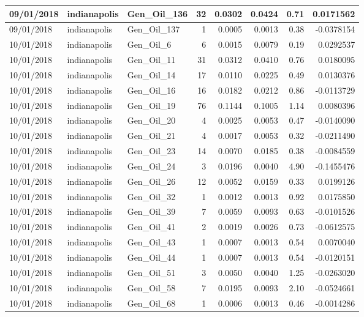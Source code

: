 \documentclass[
  letterpaper,
  DIV=11,
  numbers=noendperiod]{scrartcl}
\begin{document}
\begin{tabular}{l|l|l|r|r|r|r|r}
\hline
09/01/2018 & indianapolis & Gen\_Oil\_136 & 32 & 0.0302 & 0.0424 & 0.71 & 0.0171562\\
\hline
09/01/2018 & indianapolis & Gen\_Oil\_137 & 1 & 0.0005 & 0.0013 & 0.38 & -0.0378154\\
\hline
10/01/2018 & indianapolis & Gen\_Oil\_6 & 6 & 0.0015 & 0.0079 & 0.19 & 0.0292537\\
\hline
10/01/2018 & indianapolis & Gen\_Oil\_11 & 31 & 0.0312 & 0.0410 & 0.76 & 0.0180095\\
\hline
10/01/2018 & indianapolis & Gen\_Oil\_14 & 17 & 0.0110 & 0.0225 & 0.49 & 0.0130376\\
\hline
10/01/2018 & indianapolis & Gen\_Oil\_16 & 16 & 0.0182 & 0.0212 & 0.86 & -0.0113729\\
\hline
10/01/2018 & indianapolis & Gen\_Oil\_19 & 76 & 0.1144 & 0.1005 & 1.14 & 0.0080396\\
\hline
10/01/2018 & indianapolis & Gen\_Oil\_20 & 4 & 0.0025 & 0.0053 & 0.47 & -0.0140090\\
\hline
10/01/2018 & indianapolis & Gen\_Oil\_21 & 4 & 0.0017 & 0.0053 & 0.32 & -0.0211490\\
\hline
10/01/2018 & indianapolis & Gen\_Oil\_23 & 14 & 0.0070 & 0.0185 & 0.38 & -0.0084559\\
\hline
10/01/2018 & indianapolis & Gen\_Oil\_24 & 3 & 0.0196 & 0.0040 & 4.90 & -0.1455476\\
\hline
10/01/2018 & indianapolis & Gen\_Oil\_26 & 12 & 0.0052 & 0.0159 & 0.33 & 0.0199126\\
\hline
10/01/2018 & indianapolis & Gen\_Oil\_32 & 1 & 0.0012 & 0.0013 & 0.92 & 0.0175850\\
\hline
10/01/2018 & indianapolis & Gen\_Oil\_39 & 7 & 0.0059 & 0.0093 & 0.63 & -0.0101526\\
\hline
10/01/2018 & indianapolis & Gen\_Oil\_41 & 2 & 0.0019 & 0.0026 & 0.73 & -0.0612575\\
\hline
10/01/2018 & indianapolis & Gen\_Oil\_43 & 1 & 0.0007 & 0.0013 & 0.54 & 0.0070040\\
\hline
10/01/2018 & indianapolis & Gen\_Oil\_44 & 1 & 0.0007 & 0.0013 & 0.54 & -0.0120151\\
\hline
10/01/2018 & indianapolis & Gen\_Oil\_51 & 3 & 0.0050 & 0.0040 & 1.25 & -0.0263020\\
\hline
10/01/2018 & indianapolis & Gen\_Oil\_58 & 7 & 0.0195 & 0.0093 & 2.10 & -0.0524661\\
\hline
10/01/2018 & indianapolis & Gen\_Oil\_68 & 1 & 0.0006 & 0.0013 & 0.46 & -0.0014286\\

\end{tabular}
\end{document}

